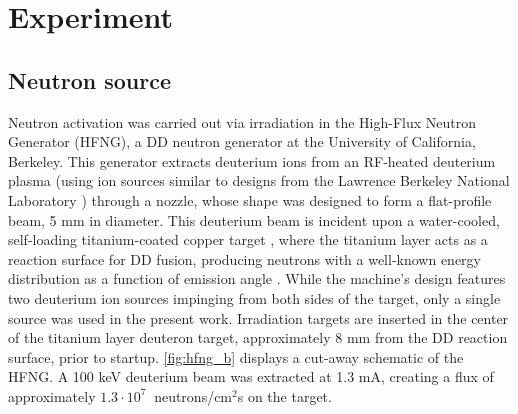 \documentclass[5p]{elsarticle}
\newcommand{\sci}[2]{ #1 \cdot 10^{#2}\ }
\newcommand{\comment}[1]{\todo[color=blue!20!white,inline]{ASV: #1}}
\begin{document}
\section{Experiment}\label{sec:experiment}



\subsection{Neutron source}\label{sec:n_source}



Neutron activation was carried out via irradiation in the High-Flux Neutron Generator (HFNG), a DD neutron generator at the University of California, Berkeley.
This generator extracts deuterium ions from an RF-heated deuterium plasma (using ion sources similar to  designs from the Lawrence Berkeley National Laboratory \cite{doi:10.1063/1.3267832}) through a nozzle, whose shape was designed to form a flat-profile beam, 5 mm in diameter.
This deuterium beam is incident upon a water-cooled, self-loading titanium-coated copper target \cite{Waltz2017,Waltz2016a}, where the titanium layer acts as a reaction surface for DD fusion, producing neutrons with a well-known energy distribution as a function of  emission angle \cite{Liskien_Paulsen_1973}.
While the machine's design features two deuterium ion sources impinging from both sides of the target, only a single source was used in the present work.
Irradiation targets are inserted in the center of the titanium layer deuteron target, approximately 8 mm from the DD reaction surface, prior to startup.
\autoref{fig:hfng_b} displays a cut-away schematic of the HFNG.
A 100 keV deuterium beam was extracted at 1.3 mA, creating a flux of approximately  $\sci{1.3}{7}$ neutrons/cm$^2$s on the target.
\end{document}
